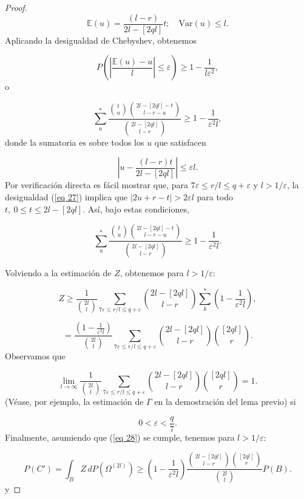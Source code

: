 \documentclass{report}
\begin{document}
\begin{proof}
\[
\mathbb{E}(u) = \frac{(l - r)}{2l - [2q l]} t; \quad \text{Var}(u) \leq l.
\]
Aplicando la desigualdad de Chebyshev, obtenemos

\[
P \left( \left| \frac{\mathbb{E}(u) - u}{l} \right| \leq \varepsilon \right) \geq 1 - \frac{1}{l \varepsilon^2},
\]
o 

\[
\sum_u^* \frac{\binom{t}{u} \binom{2l - [2q l] - t}{l - r - u}}{\binom{2l - [2q l]}{l - r}} \geq 1 - \frac{1}{\varepsilon^2 l},
\]
donde la sumatoria es sobre todos los \( u \) que satisfacen

\begin{equation}\label{eq 27}
    \left| u - \frac{(l - r) t}{2l - [2q l]} \right| \leq \varepsilon l.
\end{equation}
Por verificación directa es fácil mostrar que, para \( 7 \varepsilon \leq r/l \leq q + \varepsilon \) y \( l > 1/\varepsilon \),
la desigualdad (\ref{eq 27}) implica que \( |2u + r - t| > 2 \varepsilon l \) para todo \( t, \ 0 \leq t \leq 2l - [2q l] \).
Así, bajo estas condiciones,

\[
\sum_u^* \frac{\binom{t}{u} \binom{2l - [2q l] - t}{l - r - u}}{\binom{2l - [2q l]}{l - r}} \geq 1 - \frac{1}{\varepsilon^2 l}.
\]\newline

Volviendo a la estimación de \( Z \), obtenemos para \( l > 1/\varepsilon \):

\[
Z \geq \frac{1}{\binom{2l}{l}} \sum_{7 \varepsilon \leq r/l \leq q + \varepsilon} \binom{2l - [2q l]}{l - r} \sum_k^* \left( 1 - \frac{1}{\varepsilon^2 l} \right),
\]

\[
= \frac{\left( 1 - \frac{1}{\varepsilon^2 l} \right)}{\binom{2l}{l}} \sum_{7 \varepsilon \leq r/l \leq q + \varepsilon} \binom{2l - [2q l]}{l - r} \binom{[2q l]}{r}.
\]
Observamos que

\[
\lim_{l \to \infty} \frac{1}{\binom{2l}{l}} \sum_{7 \varepsilon \leq r/l \leq q + \varepsilon} \binom{2l - [2q l]}{l - r} \binom{[2q l]}{r} = 1.
\]
(Véase, por ejemplo, la estimación de \( \Gamma \) en la demostración del lema previo) si 

\begin{equation}\label{eq 28}
0 < \varepsilon < \frac{q}{7}.
\end{equation}
Finalmente, asumiendo que (\ref{eq 28}) se cumple, tenemos para \( l > 1/\varepsilon \):

\[
P(C') = \int_B Z \, dP(\Omega^{(2l)}) \geq \left( 1 - \frac{1}{\varepsilon^2 l} \right) \frac{\binom{2l - [2q l]}{l - r} \binom{[2q l]}{r}}{\binom{2l}{l}} P(B).
\]
y 


\end{proof}
\end{document}
